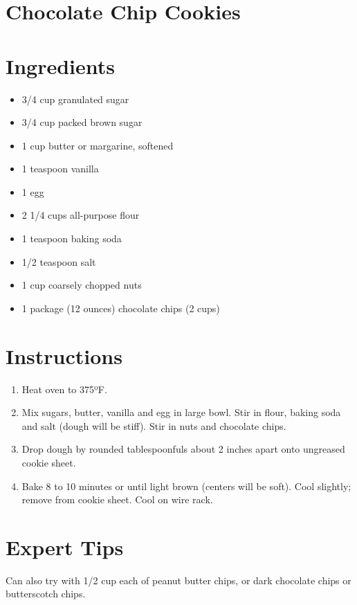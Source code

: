 \section{Chocolate Chip Cookies}

\section{Ingredients}
\begin{itemize}
\item 3/4 cup granulated sugar
\item 3/4 cup packed brown sugar
\item 1 cup butter or margarine, softened
\item 1 teaspoon vanilla
\item 1 egg
\item 2 1/4 cups all-purpose flour
\item 1 teaspoon baking soda
\item 1/2 teaspoon salt
\item 1 cup coarsely chopped nuts
\item 1 package (12 ounces) chocolate chips (2 cups)
\end{itemize}

\section{Instructions}
\begin{enumerate}
\item  Heat oven to 375ºF.
\item Mix sugars, butter, vanilla and egg in large bowl. Stir in flour, baking soda and salt (dough will be stiff). Stir in nuts and chocolate chips.
\item Drop dough by rounded tablespoonfuls about 2 inches apart onto ungreased cookie sheet.
\item Bake 8 to 10 minutes or until light brown (centers will be soft). Cool slightly; remove from cookie sheet. Cool on wire rack.
\end{enumerate}

\section*{Expert Tips}
Can also try with 1/2 cup each of peanut butter chips, or dark chocolate chips or butterscotch chips.

